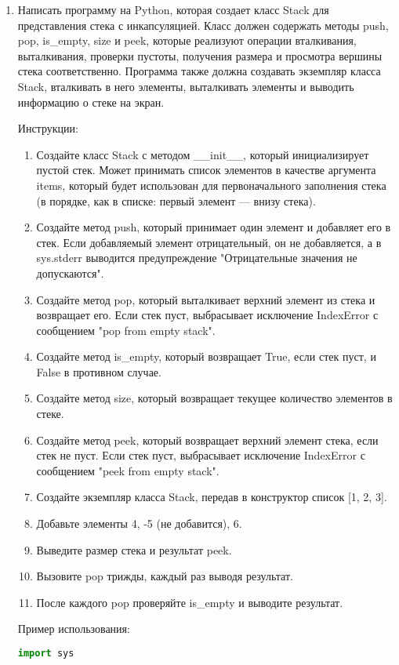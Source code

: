 \begin{enumerate}
\item Написать программу на Python, которая создает класс Stack для представления стека с инкапсуляцией. Класс должен содержать методы push, pop, is\_empty, size и peek, которые реализуют операции вталкивания, выталкивания, проверки пустоты, получения размера и просмотра вершины стека соответственно. Программа также должна создавать экземпляр класса Stack, вталкивать в него элементы, выталкивать элементы и выводить информацию о стеке на экран.

Инструкции:
\begin{enumerate}
    \item Создайте класс Stack с методом \_\_init\_\_, который инициализирует пустой стек. Может принимать список элементов в качестве аргумента items, который будет использован для первоначального заполнения стека (в порядке, как в списке: первый элемент — внизу стека).
    \item Создайте метод push, который принимает один элемент и добавляет его в стек. Если добавляемый элемент отрицательный, он не добавляется, а в sys.stderr выводится предупреждение "Отрицательные значения не допускаются".
    \item Создайте метод pop, который выталкивает верхний элемент из стека и возвращает его. Если стек пуст, выбрасывает исключение IndexError с сообщением "pop from empty stack".
    \item Создайте метод is\_empty, который возвращает True, если стек пуст, и False в противном случае.
    \item Создайте метод size, который возвращает текущее количество элементов в стеке.
    \item Создайте метод peek, который возвращает верхний элемент стека, если стек не пуст. Если стек пуст, выбрасывает исключение IndexError с сообщением "peek from empty stack".
    \item Создайте экземпляр класса Stack, передав в конструктор список [1, 2, 3].
    \item Добавьте элементы 4, -5 (не добавится), 6.
    \item Выведите размер стека и результат peek.
    \item Вызовите pop трижды, каждый раз выводя результат.
    \item После каждого pop проверяйте is\_empty и выводите результат.
\end{enumerate}

Пример использования:
\begin{lstlisting}[language=Python]
import sys


\end{lstlisting}
\end{enumerate}
